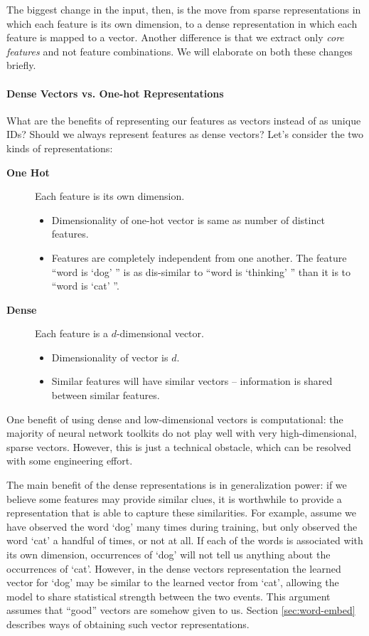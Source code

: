 \documentclass[jair,twoside,11pt,theapa]{article}
\begin{document}
{The biggest change in the input, then, is the move from sparse representations in which each
feature is its own dimension, to a dense representation in which each feature
is mapped to a vector.  Another difference is that we extract only \emph{core
features} and not feature combinations.  We will elaborate on both these changes
briefly.

\paragraph{Dense Vectors vs. One-hot Representations} 

What are the benefits of representing our features as vectors instead of as
unique IDs? Should we always represent features as dense vectors?
Let's consider the two kinds of representations:
\begin{description}
    \item[\textbf{One Hot}] Each feature is its own dimension.
        \begin{itemize}
            \item Dimensionality of one-hot vector is same as number of distinct
                features.
            \item Features are completely independent from one another.  The
                feature ``word is `dog' '' is as dis-similar to ``word is
                `thinking' ''
                than it is to ``word is `cat' ''.
        \end{itemize}
    \item[\textbf{Dense}] Each feature is a $d$-dimensional vector.
        \begin{itemize}
            \item Dimensionality of vector is $d$.
            \item Similar features will have similar vectors --
                information is shared between similar features.
        \end{itemize}
\end{description}

One benefit of using dense and low-dimensional vectors is computational: the
majority of neural network toolkits do not play well with
very high-dimensional, sparse vectors. However, this is just a technical
obstacle, which can be resolved with some engineering effort.

The main benefit of the dense representations is in generalization power: if we
believe some features may provide similar clues, it is worthwhile to provide a
representation that is able to capture these similarities.
For example, assume we have observed the word `dog' many times during
training, but only observed the word `cat' a handful of times, or not at all.
If each of the words is associated with its own dimension, occurrences of
`dog' will not tell us anything about the occurrences of `cat'. However, in
the dense vectors representation the learned vector for `dog' may be similar
to the learned vector from `cat', allowing the model to share statistical
strength between the two events.  This argument assumes that ``good'' vectors are
somehow given to us. Section \ref{sec:word-embed} describes ways of
obtaining such vector representations.

}
\end{document}
